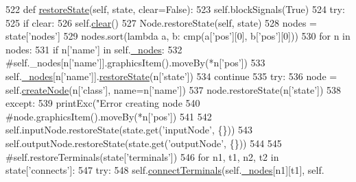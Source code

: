\begin{DoxyCode}
522     \textcolor{keyword}{def }\hyperlink{classFlowchart_1_1Flowchart_a78ab4d9dd038474d60fea7022f1314c9}{restoreState}(self, state, clear=False):
523         self.blockSignals(\textcolor{keyword}{True})
524         \textcolor{keywordflow}{try}:
525             \textcolor{keywordflow}{if} clear:
526                 self.\hyperlink{classFlowchart_1_1Flowchart_a936033a79a4c84dd73a10a52d30403d4}{clear}()
527             Node.restoreState(self, state)
528             nodes = state[\textcolor{stringliteral}{'nodes'}]
529             nodes.sort(\textcolor{keyword}{lambda} a, b: cmp(a[\textcolor{stringliteral}{'pos'}][0], b[\textcolor{stringliteral}{'pos'}][0]))
530             \textcolor{keywordflow}{for} n \textcolor{keywordflow}{in} nodes:
531                 \textcolor{keywordflow}{if} n[\textcolor{stringliteral}{'name'}] \textcolor{keywordflow}{in} self.\hyperlink{classFlowchart_1_1Flowchart_aa3d2bb6a3e73dd5d1c011c4439231aa8}{\_nodes}:
532                     \textcolor{comment}{#self.\_nodes[n['name']].graphicsItem().moveBy(*n['pos'])}
533                     self.\hyperlink{classFlowchart_1_1Flowchart_aa3d2bb6a3e73dd5d1c011c4439231aa8}{\_nodes}[n[\textcolor{stringliteral}{'name'}]].\hyperlink{classFlowchart_1_1Flowchart_a78ab4d9dd038474d60fea7022f1314c9}{restoreState}(n[\textcolor{stringliteral}{'state'}])
534                     \textcolor{keywordflow}{continue}
535                 \textcolor{keywordflow}{try}:
536                     node = self.\hyperlink{classFlowchart_1_1Flowchart_a7df20dd863563528c60699de4f51a61a}{createNode}(n[\textcolor{stringliteral}{'class'}], name=n[\textcolor{stringliteral}{'name'}])
537                     node.restoreState(n[\textcolor{stringliteral}{'state'}])
538                 \textcolor{keywordflow}{except}:
539                     printExc(\textcolor{stringliteral}{"Error creating node %
540                 \textcolor{comment}{#node.graphicsItem().moveBy(*n['pos'])}
541                 
542             self.inputNode.restoreState(state.get(\textcolor{stringliteral}{'inputNode'}, \{\}))
543             self.outputNode.restoreState(state.get(\textcolor{stringliteral}{'outputNode'}, \{\}))
544                 
545             \textcolor{comment}{#self.restoreTerminals(state['terminals'])}
546             \textcolor{keywordflow}{for} n1, t1, n2, t2 \textcolor{keywordflow}{in} state[\textcolor{stringliteral}{'connects'}]:
547                 \textcolor{keywordflow}{try}:
548                     self.\hyperlink{classFlowchart_1_1Flowchart_adfcf35da3671fb358ff0269f523779cd}{connectTerminals}(self.\hyperlink{classFlowchart_1_1Flowchart_aa3d2bb6a3e73dd5d1c011c4439231aa8}{\_nodes}[n1][t1], self.
}
\end{DoxyCode}
